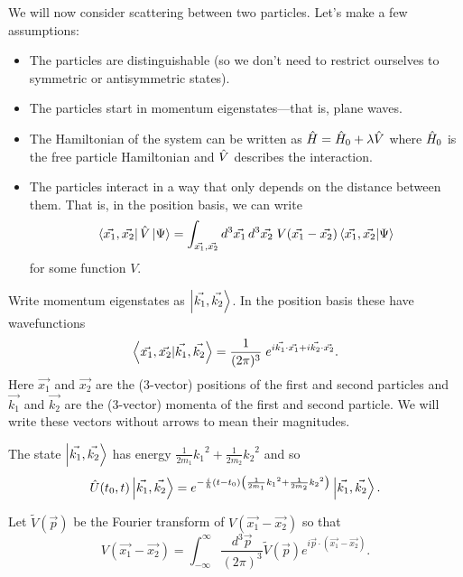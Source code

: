 
We will now consider scattering between two particles. Let's make a few assumptions:

\begin{itemize}
\item The particles are distinguishable (so we don't need to restrict ourselves to symmetric or antisymmetric states).
\item The particles start in momentum eigenstates---that is, plane waves.
\item The Hamiltonian of the system can be written as \(\hat{H} = \hat{H}_0 + \lambda \hat{V}\) where \(\hat{H}_0\) is the free particle Hamiltonian and \(\hat{V}\) describes the interaction.
\item The particles interact in a way that only depends on the distance between them. That is, in the position basis, we can write
\begin{equation}\label{eq.Vposbasis}
\left\langle\vec{x_1}, \vec{x_2}\right|\hat{V}\left|\Psi\right\rangle = \int_{\vec{x_1},\vec{x_2}} {d^3 \vec{x_1} \,d^3\vec{x_2}}\; V(\vec{x_1} - \vec{x_2}) \left\langle\vec{x_1}, \vec{x_2}|\Psi\right\rangle
\end{equation}
for some function \(V\).
\end{itemize}

Write momentum eigenstates as \(\left|\vec{k_1}, \vec{k_2}\right\rangle\). In the position basis these have wavefunctions
\begin{equation}\label{eq.momentuminpos}
\left\langle\vec{x_1}, \vec{x_2}|\vec{k_1}, \vec{k_2}\right\rangle = \frac{1}{(2\pi)^3}\;e^{i\vec{k_1}\cdot \vec{x_1} + i\vec{k_2}\cdot \vec{x_2}}.
\end{equation}
Here \(\vec{x_1}\) and \(\vec{x_2}\) are the (3-vector) positions of the first and second particles and \(\vec{k_1}\) and \(\vec{k_2}\) are the (3-vector) momenta of the first and second particle. We will write these vectors without arrows to mean their magnitudes.

The state \(\left|\vec{k_1}, \vec{k_2}\right\rangle\) has energy \(\frac{1}{2m_1}{k_1}^2 + \frac{1}{2m_2}{k_2}^2\) and so
\begin{equation}
\label{eq.timeevonk}
\hat{U}(t_0, t) \left|\vec{k_1}, \vec{k_2}\right\rangle = e^{-\frac{i}{\hbar}\left(t-t_0\right)\left(\frac{1}{2m_1}{k_1}^2 + \frac{1}{2m_2}{k_2}^2\right)} \left|\vec{k_1}, \vec{k_2}\right\rangle.
\end{equation}

Let \(\widetilde{V}(\vec{p})\) be the Fourier transform of \(V(\vec{x_1} - \vec{x_2})\) so that
\begin{equation}
\label{eq.ftV}
V(\vec{x_1} - \vec{x_2}) = \int_{-\infty}^{\infty} \frac{d^3 \vec{p}}{(2 \pi)^3} \widetilde{V}(\vec{p}) e^{i\vec{p}\cdot(\vec{x_1} - \vec{x_2})}.
\end{equation}

